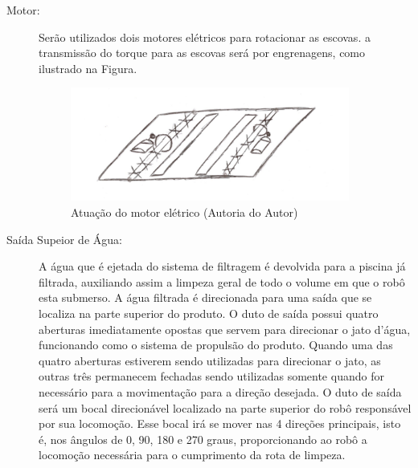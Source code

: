 \begin{description}
\item[Motor:] Serão utilizados dois motores elétricos para rotacionar as escovas.
a transmissão do torque para as escovas será por engrenagens, como ilustrado na
Figura.
\par
\begin{figure}[h]
  \centering
  \includegraphics[width=0.9\textwidth]{figures/eletric-motor.png}
  \caption{Atuação do motor elétrico (\textsf{Autoria do Autor})}
  \label{fig:eletric-motor}
\end{figure}
\FloatBarrier

\item[Saída Supeior de Água:] A água que é ejetada do sistema de filtragem é
devolvida para a piscina já filtrada, auxiliando assim a limpeza geral de todo
o volume em que o robô esta submerso. A água filtrada é direcionada para uma
saída que se localiza na parte superior do produto. O duto de saída possui quatro
aberturas imediatamente opostas que servem para direcionar o jato d’água,
funcionando como o sistema de propulsão do produto. Quando uma das quatro aberturas
estiverem sendo utilizadas para direcionar o jato, as outras três permanecem
fechadas sendo utilizadas somente quando for necessário para a movimentação para a
direção desejada. O duto de saída será um bocal direcionável localizado na
parte superior do robô responsável por sua locomoção. Esse bocal irá se mover
nas 4 direções principais, isto é, nos ângulos de 0, 90, 180 e 270 graus,
proporcionando ao robô a locomoção necessária para o cumprimento da rota de limpeza.


\end{description}
